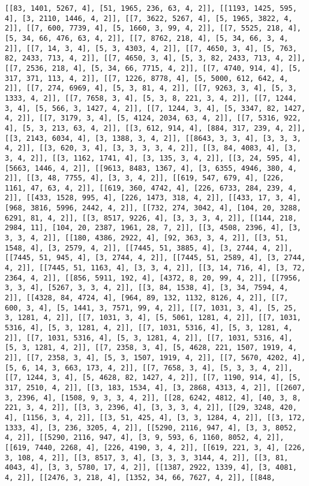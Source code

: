 \documentclass[12pt,fleqn]{article}\usepackage{../../common}
\begin{document}
\begin{verbatim}
[[83, 1401, 5267, 4], [51, 1965, 236, 63, 4, 2]], [[1193, 1425, 595, 4], [3, 2110, 1446, 4, 2]], [[7, 3622, 5267, 4], [5, 1965, 3822, 4, 2]], [[7, 600, 7739, 4], [5, 1660, 3, 99, 4, 2]], [[7, 5525, 218, 4], [5, 34, 66, 476, 63, 4, 2]], [[7, 8762, 218, 4], [5, 34, 66, 3, 4, 2]], [[7, 14, 3, 4], [5, 3, 4303, 4, 2]], [[7, 4650, 3, 4], [5, 763, 82, 2433, 713, 4, 2]], [[7, 4650, 3, 4], [5, 3, 82, 2433, 713, 4, 2]], [[7, 2536, 218, 4], [5, 34, 66, 7715, 4, 2]], [[7, 4740, 914, 4], [5, 317, 371, 113, 4, 2]], [[7, 1226, 8778, 4], [5, 5000, 612, 642, 4, 2]], [[7, 274, 6969, 4], [5, 3, 81, 4, 2]], [[7, 9263, 3, 4], [5, 3, 1333, 4, 2]], [[7, 7658, 3, 4], [5, 3, 8, 221, 3, 4, 2]], [[7, 1244, 3, 4], [5, 566, 3, 1427, 4, 2]], [[7, 1244, 3, 4], [5, 3347, 82, 1427, 4, 2]], [[7, 3179, 3, 4], [5, 4124, 2034, 63, 4, 2]], [[7, 5316, 922, 4], [5, 3, 213, 63, 4, 2]], [[3, 612, 914, 4], [884, 317, 239, 4, 2]], [[3, 2143, 6034, 4], [3, 1388, 3, 4, 2]], [[8643, 3, 3, 4], [3, 3, 3, 4, 2]], [[3, 620, 3, 4], [3, 3, 3, 3, 4, 2]], [[3, 84, 4083, 4], [3, 3, 4, 2]], [[3, 1162, 1741, 4], [3, 135, 3, 4, 2]], [[3, 24, 595, 4], [5663, 1446, 4, 2]], [[9613, 8483, 1367, 4], [3, 6355, 4946, 380, 4, 2]], [[3, 48, 7755, 4], [3, 3, 4, 2]], [[619, 547, 679, 4], [226, 1161, 47, 63, 4, 2]], [[619, 360, 4742, 4], [226, 6733, 284, 239, 4, 2]], [[433, 1528, 995, 4], [226, 1473, 318, 4, 2]], [[433, 17, 3, 4], [968, 3816, 5996, 2442, 4, 2]], [[732, 274, 3042, 4], [104, 20, 3288, 6291, 81, 4, 2]], [[3, 8517, 9226, 4], [3, 3, 3, 4, 2]], [[144, 218, 2984, 11], [104, 20, 2387, 1961, 28, 7, 2]], [[3, 4508, 2396, 4], [3, 3, 3, 4, 2]], [[180, 4386, 2922, 4], [92, 363, 3, 4, 2]], [[3, 51, 1548, 4], [3, 2579, 4, 2]], [[7445, 51, 3885, 4], [3, 2744, 4, 2]], [[7445, 51, 945, 4], [3, 2744, 4, 2]], [[7445, 51, 2589, 4], [3, 2744, 4, 2]], [[7445, 51, 1163, 4], [3, 3, 4, 2]], [[3, 14, 716, 4], [3, 72, 2364, 4, 2]], [[856, 5911, 192, 4], [4372, 8, 20, 99, 4, 2]], [[7956, 3, 3, 4], [5267, 3, 3, 4, 2]], [[3, 84, 1538, 4], [3, 34, 7594, 4, 2]], [[4328, 84, 4724, 4], [964, 89, 132, 1132, 8126, 4, 2]], [[7, 600, 3, 4], [5, 1441, 3, 7571, 99, 4, 2]], [[7, 1031, 3, 4], [5, 25, 3, 1281, 4, 2]], [[7, 1031, 3, 4], [5, 5061, 1281, 4, 2]], [[7, 1031, 5316, 4], [5, 3, 1281, 4, 2]], [[7, 1031, 5316, 4], [5, 3, 1281, 4, 2]], [[7, 1031, 5316, 4], [5, 3, 1281, 4, 2]], [[7, 1031, 5316, 4], [5, 3, 1281, 4, 2]], [[7, 2358, 3, 4], [5, 4628, 221, 1507, 1919, 4, 2]], [[7, 2358, 3, 4], [5, 3, 1507, 1919, 4, 2]], [[7, 5670, 4202, 4], [5, 6, 14, 3, 663, 173, 4, 2]], [[7, 7658, 3, 4], [5, 3, 3, 4, 2]], [[7, 1244, 3, 4], [5, 4628, 82, 1427, 4, 2]], [[7, 1190, 914, 4], [5, 317, 2510, 4, 2]], [[3, 183, 1534, 4], [3, 2868, 4313, 4, 2]], [[2607, 3, 2396, 4], [1508, 9, 3, 3, 4, 2]], [[28, 6242, 4812, 4], [40, 3, 8, 221, 3, 4, 2]], [[3, 3, 2396, 4], [3, 3, 3, 4, 2]], [[29, 3248, 420, 4], [1156, 3, 4, 2]], [[3, 51, 425, 4], [3, 3, 1284, 4, 2]], [[3, 172, 1333, 4], [3, 236, 3205, 4, 2]], [[5290, 2116, 947, 4], [3, 3, 8052, 4, 2]], [[5290, 2116, 947, 4], [3, 9, 593, 6, 1160, 8052, 4, 2]], [[619, 7440, 2268, 4], [226, 4190, 3, 4, 2]], [[619, 221, 3, 4], [226, 3, 108, 4, 2]], [[3, 8517, 3, 4], [3, 3, 3, 3144, 4, 2]], [[3, 81, 4043, 4], [3, 3, 5780, 17, 4, 2]], [[1387, 2922, 1339, 4], [3, 4081, 4, 2]], [[2476, 3, 218, 4], [1352, 34, 66, 7627, 4, 2]], [[848, 
\end{verbatim}
\end{document}
